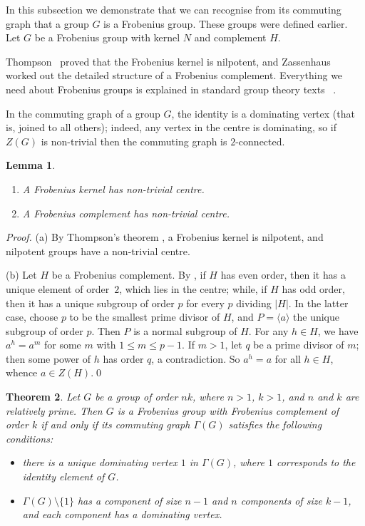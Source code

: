 \documentclass{elsarticle}
\newtheorem{theorem}{Theorem}[section]
\newtheorem{lemma}[theorem]{Lemma}
\renewcommand{\angle}[1]{\langle#1\rangle} %
\begin{document}
In this subsection we demonstrate that we can recognise from its
commuting graph that a group $G$ is a Frobenius group. These groups
were defined earlier. Let $G$ be a Frobenius group with kernel $N$
and complement $H$.

Thompson~\cite{Thompson} proved that the Frobenius kernel is
nilpotent, and Zassenhaus~\cite{Zassenhaus} worked out the detailed
structure of a Frobenius complement.  Everything we need about
Frobenius groups is explained in standard group theory texts
~\cite{passman,isaacs,serre}.

In the commuting graph of a group $G$, the identity is a dominating
vertex (that is, joined to all others); indeed, any vertex in the centre
is dominating, so if $Z(G)$ is non-trivial then the commuting graph is
$2$-connected.

\begin{lemma}\label{lem:frob}
\begin{enumerate}
\item A Frobenius kernel has non-trivial centre.
\item A Frobenius complement has non-trivial centre.
\end{enumerate}
\end{lemma}

\begin{proof}
  (a) By Thompson's theorem \cite[Theorem 1]{Thompson}, a Frobenius
  kernel is nilpotent, and nilpotent groups have a non-trivial centre.

\medskip

(b) Let $H$ be a Frobenius complement.
By \cite[Theorem 6.3, Corollary 6.10]{isaacs}\label{isaacs1},
if $H$ has even order, then it has a unique element of order~$2$, which
lies in the centre; while, if $H$ has odd order, then it has a unique
subgroup of order $p$ for every $p$ dividing $|H|$. In the latter case,
choose $p$ to be the smallest prime divisor of $H$, and $P=\angle{a}$ the
unique subgroup of order $p$. Then $P$ is a normal subgroup of $H$. For
any $h\in H$, we have $a^h=a^m$ for some $m$ with $1\le m\le p-1$. If
$m>1$, let $q$ be a prime divisor of $m$; then some power of $h$ has order
$q$, a contradiction. So $a^h=a$ for all $h\in H$, whence $a\in Z(H)$.\qed
\end{proof}

\begin{theorem}\label{frob-thm}
  Let $G$ be a group of order $nk$, where $n>1$, $k>1$, and $n$ and $k$ are
  relatively prime. Then $G$ is a Frobenius group with Frobenius
  complement of order $k$ if and only if its commuting graph
  $\Gamma(G)$ satisfies the following conditions:
\begin{itemize}
\item[(a)] there is a unique dominating vertex $1$ in $\Gamma(G)$,
  where $1$ corresponds to the identity element of $G$.
\item[(b)] $\Gamma(G)\setminus\{1\}$ has a component of size $n-1$ and
  $n$ components of size $k-1$, and each component has a dominating
  vertex.
\end{itemize}
\end{theorem}
\end{document}
